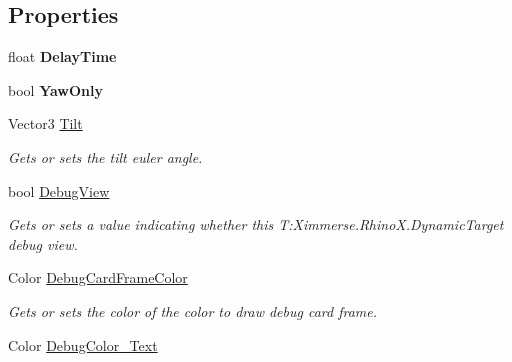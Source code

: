 \subsection*{Properties}
\begin{DoxyCompactItemize}
\item 
\mbox{\label{class_ximmerse_1_1_rhino_x_1_1_dynamic_target_afa6a6fdabf3e57d91d5945ae8f537aea}} 
float {\bfseries Delay\+Time}
\item 
\mbox{\label{class_ximmerse_1_1_rhino_x_1_1_dynamic_target_acb8d72d226cf996cd674931aa87d89ed}} 
bool {\bfseries Yaw\+Only}
\item 
Vector3 \mbox{\hyperlink{class_ximmerse_1_1_rhino_x_1_1_dynamic_target_a37e5698a43ecbe8551c95a4778498e1f}{Tilt}}
\begin{DoxyCompactList}\small\item\em Gets or sets the tilt euler angle. \end{DoxyCompactList}\item 
bool \mbox{\hyperlink{class_ximmerse_1_1_rhino_x_1_1_dynamic_target_a09cea51d7c493761a0987036d2956865}{Debug\+View}}
\begin{DoxyCompactList}\small\item\em Gets or sets a value indicating whether this T\+:\+Ximmerse.\+Rhino\+X.\+Dynamic\+Target debug view. \end{DoxyCompactList}\item 
Color \mbox{\hyperlink{class_ximmerse_1_1_rhino_x_1_1_dynamic_target_af798d3c901e13bc79c03c1044c95849b}{Debug\+Card\+Frame\+Color}}
\begin{DoxyCompactList}\small\item\em Gets or sets the color of the color to draw debug card frame. \end{DoxyCompactList}\item 
Color \mbox{\hyperlink{class_ximmerse_1_1_rhino_x_1_1_dynamic_target_a5db410106585c9c1a96f5402be2779a4}{Debug\+Color\+\_\+\+Text}}

\end{DoxyCompactItemize}
